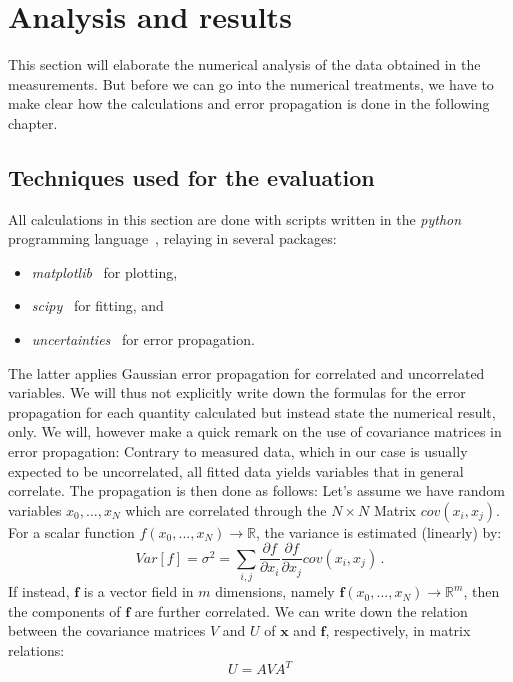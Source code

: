 \clearpage
\section{Analysis and results}
\label{sec:analysis}
This section will elaborate the numerical  analysis of the
data obtained in the measurements. But before we can go into
the numerical treatments, we have to make clear how the
calculations and error propagation is done in the following 
chapter.
\subsection{Techniques used for the evaluation}
\label{sub:techique}
All calculations in this section are done with scripts written in 
the \textit{python} programming language~\cite{python}, relaying in several 
packages:
\begin{itemize}
    \item
        \textit{matplotlib}~\cite{Hunter2007} for plotting,
    \item
        \textit{scipy}~\cite{scipy} for fitting, and 
    \item
        \textit{uncertainties}~\cite{uc} for error propagation.
\end{itemize}
The latter applies Gaussian error propagation for correlated and uncorrelated variables. 
We will thus not explicitly write down the formulas for the error propagation 
for each quantity calculated but instead state the numerical result, only. 
We will, however make a quick remark on the use of covariance matrices in 
error propagation: Contrary to measured data, which in our case is usually 
expected to be uncorrelated, all fitted data yields variables that in general correlate. 
The propagation is then done as follows:
Let's assume we have random
variables $x_0,...,x_N$ which are correlated through the $N\times N$ Matrix $cov(x_i,x_j)$.
For a scalar function $f(x_0,...,x_N) \rightarrow \mathbb{R}$, the variance is estimated (linearly) by:
\begin{equation}
Var[f] = \sigma^2 = \sum_{i,j} \frac{\partial f}{\partial x_i} \frac{\partial f}{\partial x_j} cov(x_i,x_j) \,.
\end{equation} 
If instead, $\mathbf{f}$ is a vector field in $m$ dimensions, namely 
$\mathbf{f}(x_0,...,x_N) \rightarrow \mathbb{R}^m$, then the components of $\mathbf{f}$ 
are further correlated. We can write down the relation between the covariance matrices $V$ and $U$ of 
$\mathbf{x}$ and $\mathbf{f}$, respectively, in matrix relations:
\begin{equation}
    U = A V A^T
\end{equation}
